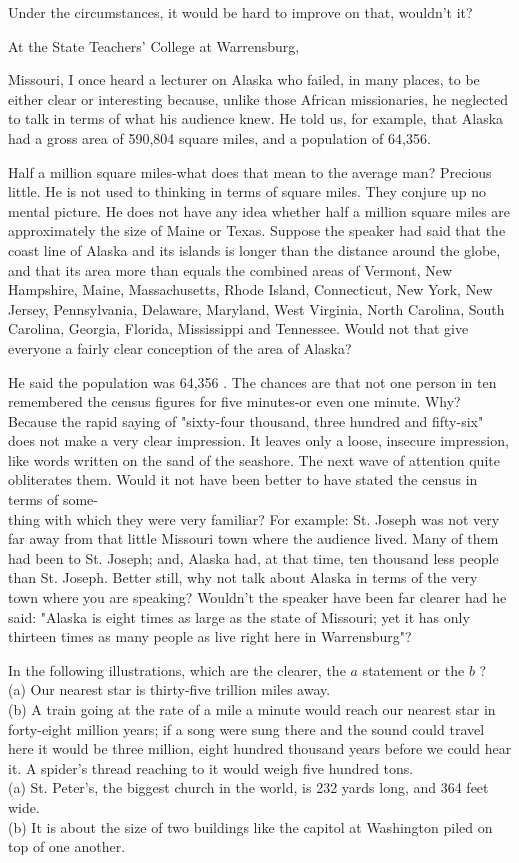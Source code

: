 \documentclass[10pt]{article}
\begin{document}
Under the circumstances, it would be hard to improve on that, wouldn't it?

At the State Teachers' College at Warrensburg,

Missouri, I once heard a lecturer on Alaska who failed, in many places, to be either clear or interesting because, unlike those African missionaries, he neglected to talk in terms of what his audience knew. He told us, for example, that Alaska had a gross area of 590,804 square miles, and a population of 64,356.

Half a million square miles-what does that mean to the average man? Precious little. He is not used to thinking in terms of square miles. They conjure up no mental picture. He does not have any idea whether half a million square miles are approximately the size of Maine or Texas. Suppose the speaker had said that the coast line of Alaska and its islands is longer than the distance around the globe, and that its area more than equals the combined areas of Vermont, New Hampshire, Maine, Massachusetts, Rhode Island, Connecticut, New York, New Jersey, Pennsylvania, Delaware, Maryland, West Virginia, North Carolina, South Carolina, Georgia, Florida, Mississippi and Tennessee. Would not that give everyone a fairly clear conception of the area of Alaska?

He said the population was 64,356 . The chances are that not one person in ten remembered the census figures for five minutes-or even one minute. Why? Because the rapid saying of "sixty-four thousand, three hundred and fifty-six" does not make a very clear impression. It leaves only a loose, insecure impression, like words written on the sand of the seashore. The next wave of attention quite obliterates them. Would it not have been better to have stated the census in terms of some-\\
thing with which they were very familiar? For example: St. Joseph was not very far away from that little Missouri town where the audience lived. Many of them had been to St. Joseph; and, Alaska had, at that time, ten thousand less people than St. Joseph. Better still, why not talk about Alaska in terms of the very town where you are speaking? Wouldn't the speaker have been far clearer had he said: "Alaska is eight times as large as the state of Missouri; yet it has only thirteen times as many people as live right here in Warrensburg"?

In the following illustrations, which are the clearer, the $a$ statement or the $b$ ?\\
(a) Our nearest star is thirty-five trillion miles away.\\
(b) A train going at the rate of a mile a minute would reach our nearest star in forty-eight million years; if a song were sung there and the sound could travel here it would be three million, eight hundred thousand years before we could hear it. A spider's thread reaching to it would weigh five hundred tons.\\
(a) St. Peter's, the biggest church in the world, is 232 yards long, and 364 feet wide.\\
(b) It is about the size of two buildings like the capitol at Washington piled on top of one another.
\end{document}
